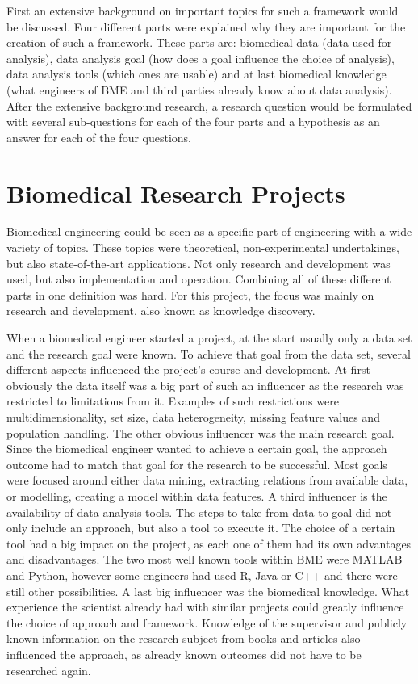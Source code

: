 \documentclass[10pt,a4paper]{article}
\begin{document}
	First an extensive background on important topics for such a framework would be discussed. Four different parts were explained why they are important for the creation of such a framework. These parts are: biomedical data (data used for analysis), data analysis goal (how does a goal influence the choice of analysis), data analysis tools (which ones are usable) and at last biomedical knowledge (what engineers of BME and third parties already know about data analysis). After the extensive background research, a research question would be formulated with several sub-questions for each of the four parts and a hypothesis as an answer for each of the four questions.
	
	\section{Biomedical Research Projects}
	\label{sec:Baciomedical Research Projects}
	
	Biomedical engineering could be seen as a specific part of engineering with a wide variety of topics. These topics were theoretical, non-experimental undertakings, but also state-of-the-art applications. Not only research and development was used, but also implementation and operation. Combining all of these different parts in one definition was hard.\cite{bronzino2014biomedical} For this project, the focus was mainly on research and development, also known as knowledge discovery.\cite{bramer2007principles} 
	
	When a biomedical engineer started a project, at the start usually only a data set and the research goal were known. To achieve that goal from the data set, several different aspects influenced the project's course and development. At first obviously the data itself was a big part of such an influencer as the research was restricted to limitations from it. Examples of such restrictions were multidimensionality, set size, data heterogeneity, missing feature values and population handling. The other obvious influencer was the main research goal. Since the biomedical engineer wanted to achieve a certain goal, the approach outcome had to match that goal for the research to be successful. Most goals were focused around either data mining, extracting relations from available data, or modelling, creating a model within data features. A third influencer is the availability of data analysis tools. The steps to take from data to goal did not only include an approach, but also a tool to execute it. The choice of a certain tool had a big impact on the project, as each one of them had its own advantages and disadvantages. The two most well known tools within BME were MATLAB and Python, however some engineers had used R, Java or C++ and there were still other possibilities. A last big influencer was the biomedical knowledge. What experience the scientist already had with similar projects could greatly influence the choice of approach and framework. Knowledge of the supervisor and publicly known information on the research subject from books and articles also influenced the approach, as already known outcomes did not have to be researched again. 
	
\end{document}
